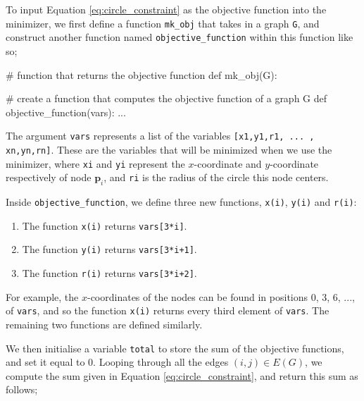 \begin{flushleft}
To input Equation \ref{eq:circle_constraint} as the objective function into the minimizer, we first define a function \texttt{mk\_obj} that takes in a graph \texttt{G}, and construct another function named \texttt{objective\_function} within this function like so;
\end{flushleft}

\begin{code}
    # function that returns the objective function
    def mk_obj(G):
        
        # create a function that computes the objective function of a graph G
        def objective_function(vars):
        ...
\end{code}

\begin{flushleft}
The argument \texttt{vars} represents a list of the variables \texttt{[x1,y1,r1, ... , xn,yn,rn]}. These are the variables that will be minimized when we use the minimizer, where \texttt{xi} and \texttt{yi} represent the $x$-coordinate and $y$-coordinate respectively of node $\textbf{p}_i$, and \texttt{ri} is the radius of the circle this node centers.
\end{flushleft}

\begin{flushleft}
Inside \texttt{objective\_function}, we define three new functions, \texttt{x(i)}, \texttt{y(i)} and \texttt{r(i)}:

\begin{enumerate}
    \item The function \texttt{x(i)} returns \texttt{vars[3*i]}.
    \vspace{-3mm}
    \item The function \texttt{y(i)} returns \texttt{vars[3*i+1]}.
    \vspace{-3mm}
    \item The function \texttt{r(i)} returns \texttt{vars[3*i+2]}.
\end{enumerate}

For example, the $x$-coordinates of the nodes can be found in positions 0, 3, 6, ..., of \texttt{vars}, and so the function \texttt{x(i)} returns every third element of \texttt{vars}. The remaining two functions are defined similarly.
\end{flushleft}

\begin{flushleft}
We then initialise a variable \texttt{total} to store the sum of the objective functions, and set it equal to 0. Looping through all the edges $(i,j) \in E(G)$, we compute the sum given in Equation \ref{eq:circle_constraint}, and return this sum as follows;
\end{flushleft}

